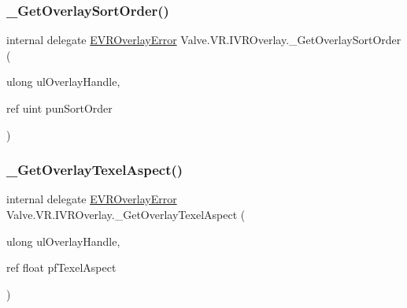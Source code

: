\mbox{\label{struct_valve_1_1_v_r_1_1_i_v_r_overlay_a7e5ffdaf685b8384808a52d2fef43022}} 
\subsubsection{\texorpdfstring{\_GetOverlaySortOrder()}{\_GetOverlaySortOrder()}}
{\footnotesize\ttfamily internal delegate \mbox{\hyperlink{namespace_valve_1_1_v_r_aaee5c5144f42b7969d45b854f51b0c18}{E\+V\+R\+Overlay\+Error}} Valve.\+V\+R.\+I\+V\+R\+Overlay.\+\_\+\+Get\+Overlay\+Sort\+Order (\begin{DoxyParamCaption}\item[{ulong}]{ul\+Overlay\+Handle,  }\item[{ref uint}]{pun\+Sort\+Order }\end{DoxyParamCaption})}

\mbox{\label{struct_valve_1_1_v_r_1_1_i_v_r_overlay_a235f2a043c603054667fe6c3df416dce}} 
\subsubsection{\texorpdfstring{\_GetOverlayTexelAspect()}{\_GetOverlayTexelAspect()}}
{\footnotesize\ttfamily internal delegate \mbox{\hyperlink{namespace_valve_1_1_v_r_aaee5c5144f42b7969d45b854f51b0c18}{E\+V\+R\+Overlay\+Error}} Valve.\+V\+R.\+I\+V\+R\+Overlay.\+\_\+\+Get\+Overlay\+Texel\+Aspect (\begin{DoxyParamCaption}\item[{ulong}]{ul\+Overlay\+Handle,  }\item[{ref float}]{pf\+Texel\+Aspect }\end{DoxyParamCaption})}

\mbox{\label{struct_valve_1_1_v_r_1_1_i_v_r_overlay_a4736d358cfb1631b67f42d25c9850da3}} 
